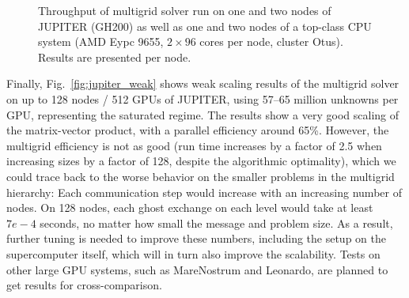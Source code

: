 \documentclass[a4paper,12pt]{article}
\begin{document}
\begin{figure}
	\caption{Throughput of multigrid solver run on one and two nodes of JUPITER
		(GH200) as well as one and two nodes of a top-class CPU system (AMD Eypc
		9655, $2\times 96$ cores per node, cluster Otus). Results are presented per node.}
	\label{fig:mg_jupiter}
\end{figure}

Finally, Fig.~\ref{fig:jupiter_weak} shows weak scaling results of the
multigrid solver on up to 128 nodes / 512 GPUs of JUPITER, using 57--65
million unknowns per GPU, representing the saturated regime. The results show
a very good scaling of the matrix-vector product, with a parallel efficiency
around 65\%. However, the multigrid efficiency is not as good (run time
increases by a factor of 2.5 when increasing sizes by a factor of 128, despite
the algorithmic optimality), which we could trace back to the worse behavior
on the smaller problems in the multigrid hierarchy: Each communication step
would increase with an increasing number of nodes. On 128 nodes, each ghost
exchange on each level would take at least $7e-4$ seconds, no matter how small
the message and problem size. As a result, further tuning is needed to improve
these numbers, including the setup on the supercomputer itself, which will in
turn also improve the scalability. Tests on other large GPU systems, such as
MareNostrum and Leonardo, are planned to get results for cross-comparison.
\end{document}
